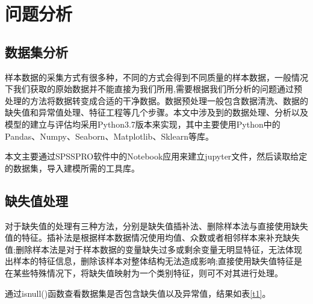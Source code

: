 \section{问题分析}

\subsection{数据集分析}
样本数据的采集方式有很多种，不同的方式会得到不同质量的样本数据，一般情况下我们获取的原始数据并不能直接为我们所用,需要根据我们所分析的问题通过预处理的方法将数据转变成合适的干净数据。数据预处理一般包含数据清洗、数据的缺失值和异常值处理、特征工程等几个步骤。本文中涉及到的数据处理、分析以及模型的建立与评估均采用Python3.7版本来实现，其中主要使用Python中的Pandas、Numpy、Seaborn、Matplotlib、Sklearn等库\textsuperscript{\cite{b6}}。

本文主要通过SPSSPRO软件中的Notebook应用来建立jupyter文件，然后读取给定的数据集，导入建模所需的工具库。

\subsection{缺失值处理}
对于缺失值的处理有三种方法，分别是缺失值插补法、删除样本法与直接使用缺失值的特征。插补法是根据样本数据情况使用均值、众数或者相邻样本来补充缺失值;删除样本法是对于样本数据的变量缺失过多或剩余变量无明显特征，无法体现出样本的特征信息，删除该样本对整体结构无法造成影响;直接使用缺失值特征是在某些特殊情况下，将缺失值映射为一个类别特征，则可不对其进行处理。

通过isnull()函数查看数据集是否包含缺失值以及异常值，结果如表\ref{t1}。
\begin{table}[!htbp]
	\centering
	\setlength{\abovecaptionskip}{3pt}%
	\caption{缺失值检测}
	\vspace{1pt}
	\label{t1}
\end{table}

